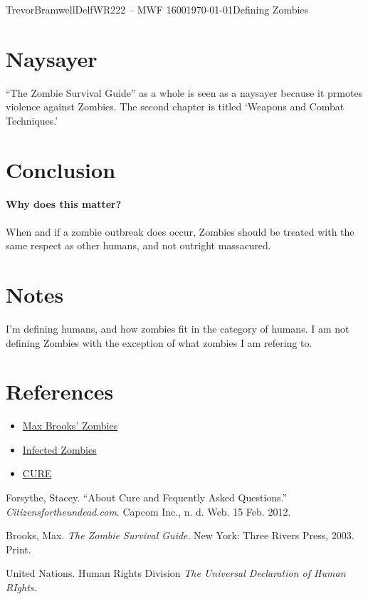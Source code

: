 \documentclass[12pt,letterpaper]{article}
\begin{document}
\begin{mla}{Trevor}{Bramwell}{Delf}{WR222 -- MWF 1600}{\today}{Defining Zombies}
\section*{Naysayer}
``The Zombie Survival Guide'' as a whole is seen as a naysayer because it
prmotes violence against Zombies. The second chapter is titled `Weapons and
Combat Techniques.'


\section*{Conclusion}
\paragraph{Why does this matter?}
When and if a zombie outbreak does occur, Zombies should be treated with the
same respect as other humans, and not outright massacured. 



\section*{Notes}
I'm defining humans, and how zombies fit in the category of humans.
I am not defining Zombies with the exception of what zombies I am refering to.




\section*{References}
\begin{itemize}
\item
\href{http://zombie.wikia.com/wiki/Zombies\_(Max\_Brooks)}{Max Brooks' Zombies}
\item
\href{http://zombie.wikia.com/wiki/Infected}{Infected Zombies}
\item
\href{http://www.citizensfortheundead.com/about.html}{CURE}
\end{itemize}

\begin{workscited}
\bibent
Forsythe, Stacey. ``About Cure and Fequently Asked Questions.'' \emph{Citizensfortheundead.com}. Capcom Inc., n. d. Web. 15 Feb. 2012.

\bibent
Brooks, Max. \emph{The Zombie Survival Guide}. New York: Three Rivers Press,
2003. Print.

\bibent
United Nations. Human Rights Division \emph{The Universal Declaration of Human RIghts.} 
\end{workscited}
\end{mla}
\end{document}
